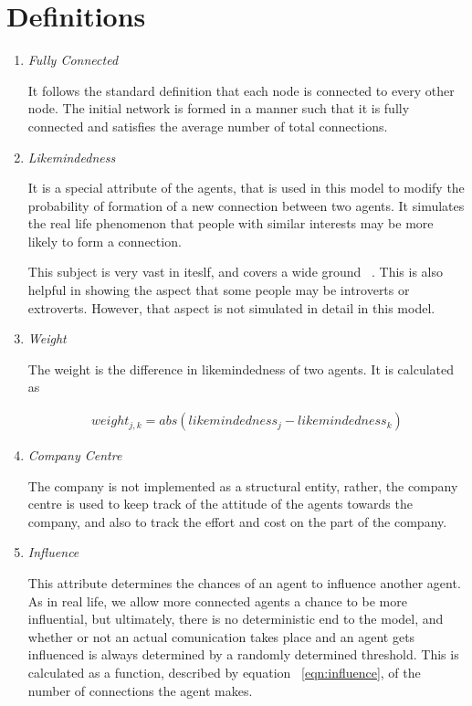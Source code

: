 \section{Definitions}
\label{sec:definitions}
\begin{enumerate}
\item \emph{Fully Connected}

It follows the standard definition that each node is connected to every other node. The initial network is formed in a manner such that it is fully connected and satisfies the average number of total connections.

\item \emph{Likemindedness}

It is a special attribute of the agents, that is used in this model to modify the probability of formation of a new connection between two agents. It simulates the real life phenomenon that people with similar interests may be more likely to form a connection. 

This subject is very vast in iteslf, and covers a wide ground ~\cite{jung1921question, Wilt08extraversion}. This is also helpful in showing the aspect that some people may be introverts or extroverts. However, that aspect is not simulated in detail in this model.

\item \emph{Weight}

The weight is the difference in likemindedness of two agents. It is calculated as 

\begin{eqnarray}
weight_{j,k} = abs( likemindedness_{j} - likemindedness_{k} )
\label{eqn:weight}
\end{eqnarray}

\item \emph{Company Centre}

The company is not implemented as a structural entity, rather, the company centre is used to keep track of the attitude of the agents towards the company, and also to track the effort and cost on the part of the company.

\item \emph{Influence}

This attribute determines the chances of an agent to influence another agent. As in real life, we allow more connected agents a chance to be more influential, but ultimately, there is no deterministic end to the model, and whether or not an actual comunication takes place and an agent gets influenced is always determined by a randomly determined threshold. 
This is calculated as a function, described by equation ~\ref{eqn:influence}, of the number of connections the agent makes.


\end{enumerate}
